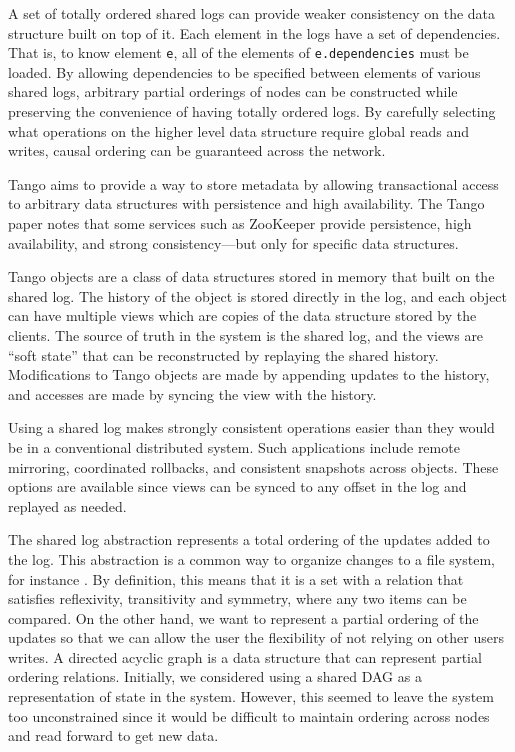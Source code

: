 \documentclass[letterpaper,twocolumn,10pt]{article}
\begin{document}
A set of totally ordered shared logs can provide weaker consistency on the data structure built on top of it. Each element in the logs have a set of dependencies. That is, to know element \verb_e_, all of the elements of \verb_e.dependencies_ must be loaded.  By allowing dependencies to be specified between elements of various shared logs, arbitrary partial orderings of nodes can be constructed while preserving the convenience of having totally ordered logs. By carefully selecting what operations on the higher level data structure require global reads and writes, causal ordering can be guaranteed across the network.

Tango \cite{Tango} aims to provide a way to store metadata by allowing transactional access to arbitrary data structures with persistence and high availability. The Tango paper notes that some services such as ZooKeeper \cite{hunt2010zookeeper} provide persistence, high availability, and strong consistency---but only for specific data structures.

Tango objects are a class of data structures stored in memory that built on the shared log. The history of the object is stored directly in the log, and each object can have multiple views which are copies of the data structure stored by the clients. The source of truth in the system is the shared log, and the views are ``soft state'' that can be reconstructed by replaying the shared history. Modifications to Tango objects are made by appending updates to the history, and accesses are made by syncing the view with the history.

Using a shared log makes strongly consistent operations easier than they would be in a conventional distributed system. Such applications include remote mirroring, coordinated rollbacks, and consistent snapshots across objects. These options are available since views can be synced to any offset in the log and replayed as needed.

The shared log abstraction represents a total ordering of the updates added to the log. This abstraction is a common way to organize changes to a file system, for instance \cite{Log}. By definition, this means that it is a set with a relation that satisfies reflexivity, transitivity and symmetry, where any two items can be compared. On the other hand, we want to represent a partial ordering of the updates so that we can allow the user the flexibility of not relying on other users writes. A directed acyclic graph is a data structure that can represent partial ordering relations. Initially, we considered using a shared DAG as a representation of state in the system. However, this seemed to leave the system too unconstrained since it would be difficult to maintain ordering across nodes and read forward to get new data. 
\end{document}
